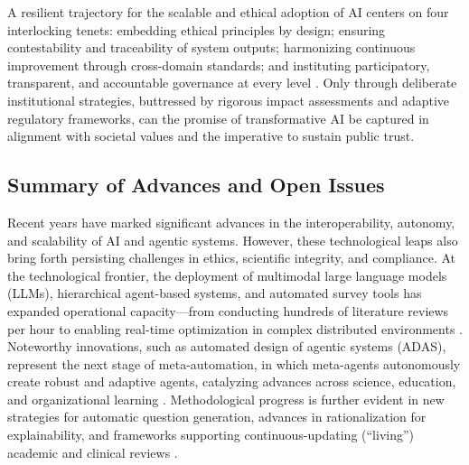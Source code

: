 \documentclass[sigconf]{acmart}
\begin{document}
A resilient trajectory for the scalable and ethical adoption of AI centers on four interlocking tenets: embedding ethical principles by design; ensuring contestability and traceability of system outputs; harmonizing continuous improvement through cross-domain standards; and instituting participatory, transparent, and accountable governance at every level \cite{ref74,ref75,ref80,ref84,ref95,ref96,ref97,ref98,ref100,ref102,ref104,ref106,ref109,ref110}. Only through deliberate institutional strategies, buttressed by rigorous impact assessments and adaptive regulatory frameworks, can the promise of transformative AI be captured in alignment with societal values and the imperative to sustain public trust.

\subsection{Summary of Advances and Open Issues}

Recent years have marked significant advances in the interoperability, autonomy, and scalability of AI and agentic systems. However, these technological leaps also bring forth persisting challenges in ethics, scientific integrity, and compliance. At the technological frontier, the deployment of multimodal large language models (LLMs), hierarchical agent-based systems, and automated survey tools has expanded operational capacity—from conducting hundreds of literature reviews per hour to enabling real-time optimization in complex distributed environments \cite{ref31,ref47,ref49,ref74,ref80,ref84,ref100,ref102,ref104}. Noteworthy innovations, such as automated design of agentic systems (ADAS), represent the next stage of meta-automation, in which meta-agents autonomously create robust and adaptive agents, catalyzing advances across science, education, and organizational learning \cite{ref31,ref34,ref35,ref47,ref49}. Methodological progress is further evident in new strategies for automatic question generation, advances in rationalization for explainability, and frameworks supporting continuous-updating (“living”) academic and clinical reviews \cite{ref74,ref84,ref100,ref102,ref104}.
\end{document}
